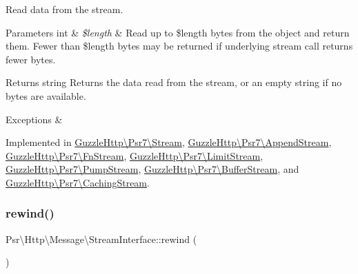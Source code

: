 Read data from the stream.


\begin{DoxyParams}[1]{Parameters}
int & {\em \$length} & Read up to \$length bytes from the object and return them. Fewer than \$length bytes may be returned if underlying stream call returns fewer bytes. \\
\hline
\end{DoxyParams}
\begin{DoxyReturn}{Returns}
string Returns the data read from the stream, or an empty string if no bytes are available. 
\end{DoxyReturn}

\begin{DoxyExceptions}{Exceptions}
{\em } & \\
\hline
\end{DoxyExceptions}


Implemented in \hyperlink{classGuzzleHttp_1_1Psr7_1_1Stream_a4f9990fde8a72f6555cc3a55ee6c9a98}{Guzzle\+Http\textbackslash{}\+Psr7\textbackslash{}\+Stream}, \hyperlink{classGuzzleHttp_1_1Psr7_1_1AppendStream_a4f80293cfe091483f32343f55d411ef4}{Guzzle\+Http\textbackslash{}\+Psr7\textbackslash{}\+Append\+Stream}, \hyperlink{classGuzzleHttp_1_1Psr7_1_1FnStream_a514406fd0b0a778e0c94c5327ed7ce0c}{Guzzle\+Http\textbackslash{}\+Psr7\textbackslash{}\+Fn\+Stream}, \hyperlink{classGuzzleHttp_1_1Psr7_1_1LimitStream_a5c6d3611a68073edd5927d82296d272f}{Guzzle\+Http\textbackslash{}\+Psr7\textbackslash{}\+Limit\+Stream}, \hyperlink{classGuzzleHttp_1_1Psr7_1_1PumpStream_acf2e568c0d25b1174fa070efb4def9db}{Guzzle\+Http\textbackslash{}\+Psr7\textbackslash{}\+Pump\+Stream}, \hyperlink{classGuzzleHttp_1_1Psr7_1_1BufferStream_a7c5ee28064aec7dcf831845c3f7b18e7}{Guzzle\+Http\textbackslash{}\+Psr7\textbackslash{}\+Buffer\+Stream}, and \hyperlink{classGuzzleHttp_1_1Psr7_1_1CachingStream_ae9f074ce44f716bcc5d5ef5e4357785b}{Guzzle\+Http\textbackslash{}\+Psr7\textbackslash{}\+Caching\+Stream}.

\mbox{\label{interfacePsr_1_1Http_1_1Message_1_1StreamInterface_a48721ef4d5097250a3f94515938393c9}} 
\subsubsection{\texorpdfstring{rewind()}{rewind()}}
{\footnotesize\ttfamily Psr\textbackslash{}\+Http\textbackslash{}\+Message\textbackslash{}\+Stream\+Interface\+::rewind (\begin{DoxyParamCaption}{ }\end{DoxyParamCaption})}

